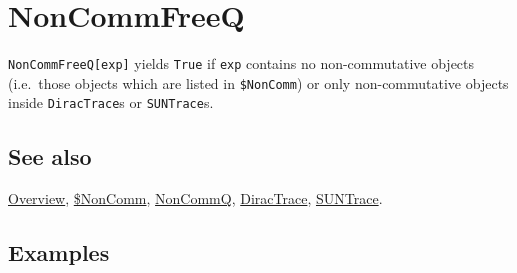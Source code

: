 \documentclass[../FeynCalcManual.tex]{subfiles}
\begin{document}
\hypertarget{noncommfreeq}{%
\section{NonCommFreeQ}\label{noncommfreeq}}

\texttt{NonCommFreeQ[\allowbreak{}exp]} yields \texttt{True} if
\texttt{exp} contains no non-commutative objects (i.e.~those objects
which are listed in \texttt{\$NonComm}) or only non-commutative objects
inside \texttt{DiracTrace}s or \texttt{SUNTrace}s.

\subsection{See also}

\hyperlink{toc}{Overview}, \hyperlink{noncomm}{\$NonComm},
\hyperlink{noncommq}{NonCommQ}, \hyperlink{diractrace}{DiracTrace},
\hyperlink{suntrace}{SUNTrace}.

\subsection{Examples}
\end{document}
